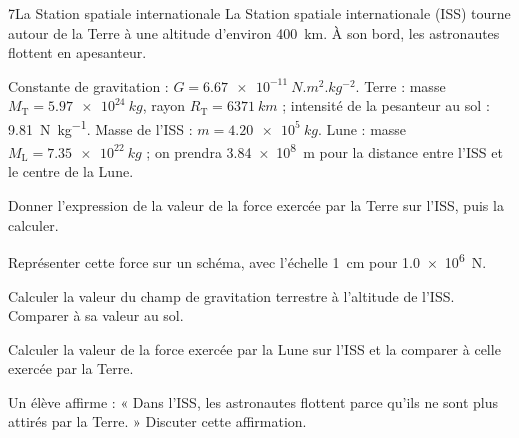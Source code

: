 

\begin{exoBac}{7}{La Station spatiale internationale}
La Station spatiale internationale (ISS) tourne autour de la Terre à une altitude d'environ \qty{400}{km}. À son bord, les astronautes
flottent en apesanteur.
\begin{donnees}
Constante de gravitation : $G=\qty{6,67e-11}{N.m^2.kg^{-2}}$. Terre : masse $M_\mathrm{T}=\qty{5,97e24}{kg}$, rayon $R_\mathrm{T}=\qty{6371}{km}$ ; intensité
de la pesanteur au sol : \qty{9,81}{N.kg^{-1}}. Masse de l'ISS : $m=\qty{4,20e5}{kg}$. Lune : masse $M_\mathrm{L}=\qty{7,35e22}{kg}$ ; on prendra
\qty{3,84e8}{m} pour la distance entre l'ISS et le centre de la Lune.
\end{donnees}
\begin{questions}
\item Donner l'expression de la valeur de la force exercée par la Terre sur l'ISS, puis la calculer.
\item Représenter cette force sur un schéma, avec l'échelle \qty{1}{cm} pour \qty{1,0e6}{N}.
\item Calculer la valeur du champ de gravitation terrestre à l'altitude de l'ISS. Comparer à sa valeur au sol.
\item Calculer la valeur de la force exercée par la Lune sur l'ISS et la comparer à celle exercée par la Terre.
\item \initiative Un élève affirme : « Dans l'ISS, les astronautes flottent parce qu'ils ne sont plus attirés par la Terre. »
Discuter cette affirmation.
\end{questions}
\end{exoBac}

